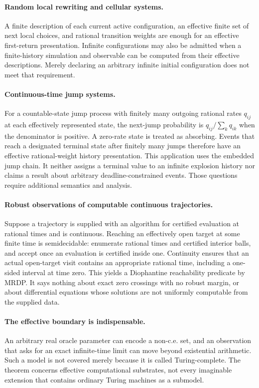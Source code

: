 \documentclass[11pt,letterpaper]{article}
\numberwithin{equation}{section}
\theoremstyle{definition}
\theoremstyle{remark}
\begin{document}
\paragraph{Random local rewriting and cellular systems.}
A finite description of each current active configuration, an effective
finite set of next local choices, and rational transition weights are enough
for an effective first-return presentation. Infinite configurations may
also be admitted when a finite-history simulation and observable can be
computed from their effective descriptions. Merely declaring an arbitrary
infinite initial configuration does not meet that requirement.

\paragraph{Continuous-time jump systems.}
For a countable-state jump process with finitely many outgoing rational
rates $q_{ij}$ at each effectively represented state, the next-jump
probability is $q_{ij}/\sum_kq_{ik}$ when the denominator is positive.
A zero-rate state is treated as absorbing. Events that reach a designated
terminal state after finitely many jumps therefore have an effective
rational-weight history presentation. This application uses the embedded
jump chain. It neither assigns a terminal value to an infinite explosion
history nor claims a result about arbitrary deadline-constrained events.
Those questions require additional semantics and analysis.

\paragraph{Robust observations of computable continuous trajectories.}
Suppose a trajectory is supplied with an algorithm for certified evaluation
at rational times and is continuous. Reaching an effectively open target
at some finite time is semidecidable: enumerate rational times and certified
interior balls, and accept once an evaluation is certified inside one.
Continuity ensures that an actual open-target visit contains an appropriate
rational time, including a one-sided interval at time zero. This yields a
Diophantine reachability predicate by MRDP. It says nothing about exact
zero crossings with no robust margin, or about differential equations whose
solutions are not uniformly computable from the supplied data.

\paragraph{The effective boundary is indispensable.}
An arbitrary real oracle parameter can encode a non-c.e. set, and an
observation that asks for an exact infinite-time limit can move beyond
existential arithmetic. Such a model is not covered merely because it is
called Turing-complete. The theorem concerns effective computational
substrates, not every imaginable extension that contains ordinary Turing
machines as a submodel.
\end{document}
